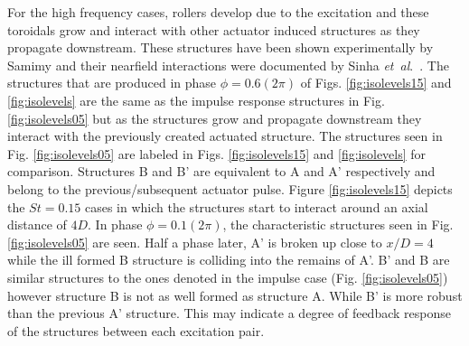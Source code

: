 \documentclass[english]{aiaa-tc}
\newcommand*{\etal}{\textit{et~al}.\ }
\begin{document}
For the high frequency cases, rollers develop due to the excitation and these toroidals grow and interact with other actuator induced structures as they propagate downstream. These structures  have been shown experimentally by Samimy \cite{sm2007} and their nearfield interactions were documented by Sinha \etal \cite{sinha2013}.
The structures that are produced in phase $\phi=0.6(2\pi)$ of Figs. \ref{fig:isolevels15} and \ref{fig:isolevels} are the same as the impulse response structures in Fig. \ref{fig:isolevels05} but as the structures grow and propagate downstream they interact with the previously created actuated structure. The structures seen in Fig. \ref{fig:isolevels05} are labeled in Figs. \ref{fig:isolevels15} and \ref{fig:isolevels} for comparison. Structures B and B' are equivalent to A and A' respectively and belong to the previous/subsequent actuator pulse.
Figure \ref{fig:isolevels15} depicts the $St=0.15$ cases in which the structures start to interact around an axial distance of $4D$. In phase $\phi=0.1(2\pi)$, the characteristic structures seen in Fig. \ref{fig:isolevels05} are seen. Half a phase later, A' is broken up close to $x/D=4$ while the ill formed B structure is colliding into the remains of A'. B' and B are similar structures to the ones denoted in the impulse case (Fig. \ref{fig:isolevels05}) however structure B is not as well formed as structure A. While B' is more robust than the previous A' structure. This may indicate a degree of feedback response of the structures between each excitation pair. %
\end{document}
